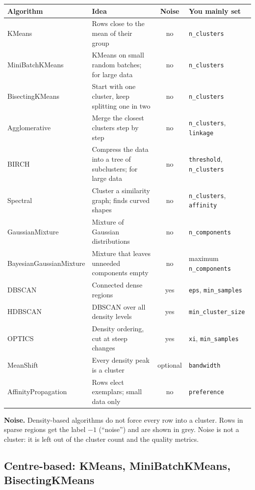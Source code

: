 \documentclass[11pt,a4paper]{article}
\newcommand{\param}[1]{\texttt{#1}}         %
\begin{document}
\begin{center}
\small
\begin{tabularx}{\textwidth}{lLcL}
\toprule
Algorithm & Idea & Noise & You mainly set\\
\midrule
KMeans & Rows close to the mean of their group & no & \param{n\_clusters}\\
MiniBatchKMeans & KMeans on small random batches; for large data & no & \param{n\_clusters}\\
BisectingKMeans & Start with one cluster, keep splitting one in two & no & \param{n\_clusters}\\
Agglomerative & Merge the closest clusters step by step & no & \param{n\_clusters}, \param{linkage}\\
BIRCH & Compress the data into a tree of subclusters; for large data & no & \param{threshold},
  \param{n\_clusters}\\
Spectral & Cluster a similarity graph; finds curved shapes & no & \param{n\_clusters}, \param{affinity}\\
GaussianMixture & Mixture of Gaussian distributions & no & \param{n\_components}\\
BayesianGaussianMixture & Mixture that leaves unneeded components empty & no & maximum \param{n\_components}\\
DBSCAN & Connected dense regions & yes & \param{eps}, \param{min\_samples}\\
HDBSCAN & DBSCAN over all density levels & yes & \param{min\_cluster\_size}\\
OPTICS & Density ordering, cut at steep changes & yes & \param{xi}, \param{min\_samples}\\
MeanShift & Every density peak is a cluster & optional & \param{bandwidth}\\
AffinityPropagation & Rows elect exemplars; small data only & no & \param{preference}\\
\bottomrule
\end{tabularx}
\end{center}

\textbf{Noise.} Density-based algorithms do not force every row into a cluster. Rows in sparse regions get the
label $-1$ (``noise'') and are shown in grey. Noise is not a cluster: it is left out of the cluster count and the
quality metrics.

\subsection{Centre-based: KMeans, MiniBatchKMeans, BisectingKMeans}
\end{document}
